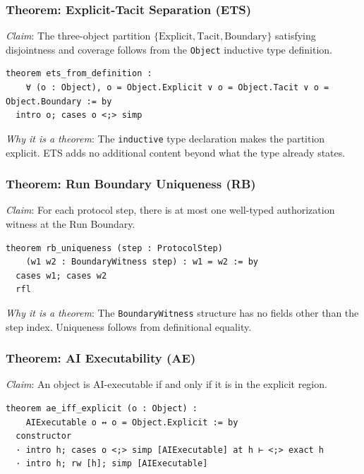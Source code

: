 \subsubsection{Theorem: Explicit-Tacit Separation (ETS)}

\textit{Claim}: The three-object partition $\{\text{Explicit}, \text{Tacit},
\text{Boundary}\}$ satisfying disjointness and coverage follows from the
\texttt{Object} inductive type definition.

\begin{lstlisting}
theorem ets_from_definition :
    ∀ (o : Object), o = Object.Explicit ∨ o = Object.Tacit ∨ o = Object.Boundary := by
  intro o; cases o <;> simp
\end{lstlisting}

\textit{Why it is a theorem}: The \texttt{inductive} type declaration makes the
partition explicit. ETS adds no additional content beyond what the type already
states.

\subsubsection{Theorem: Run Boundary Uniqueness (RB)}

\textit{Claim}: For each protocol step, there is at most one well-typed
authorization witness at the Run Boundary.

\begin{lstlisting}
theorem rb_uniqueness (step : ProtocolStep)
    (w1 w2 : BoundaryWitness step) : w1 = w2 := by
  cases w1; cases w2
  rfl
\end{lstlisting}

\textit{Why it is a theorem}: The \texttt{BoundaryWitness} structure has no
fields other than the step index. Uniqueness follows from definitional equality.

\subsubsection{Theorem: AI Executability (AE)}

\textit{Claim}: An object is AI-executable if and only if it is in the explicit
region.

\begin{lstlisting}
theorem ae_iff_explicit (o : Object) :
    AIExecutable o ↔ o = Object.Explicit := by
  constructor
  · intro h; cases o <;> simp [AIExecutable] at h ⊢ <;> exact h
  · intro h; rw [h]; simp [AIExecutable]
\end{lstlisting}

